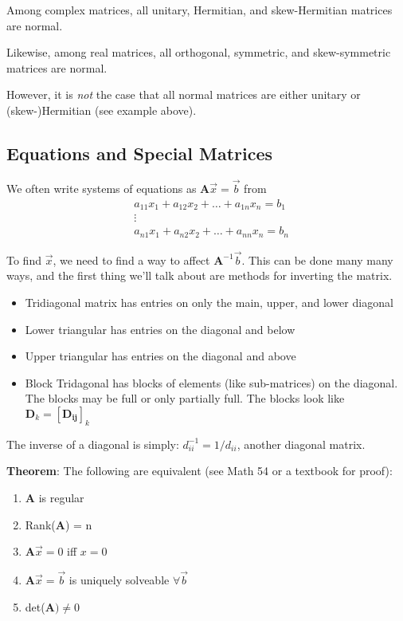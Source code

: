 \documentclass[12pt]{article}
\newcommand{\ve}[1]{\ensuremath{\mathbf{#1}}}
\begin{document}
Among complex matrices, all unitary, Hermitian, and skew-Hermitian matrices are normal. 

Likewise, among real matrices, all orthogonal, symmetric, and skew-symmetric matrices are normal. 

However, it is \textit{not} the case that all normal matrices are either unitary or (skew-)Hermitian (see example above).%

\subsection{Equations and Special Matrices}

We often write systems of equations as $\ve{A}\vec{x} = \vec{b}$ from
\begin{align}
&a_{11} x_1 + a_{12} x_2 + \dots + a_{1n} x_n = b_1 \nonumber \\
&\vdots \nonumber \\
&a_{n1} x_1 + a_{n2} x_2 + \dots + a_{nn} x_n = b_n \nonumber
\end{align}

To find $\vec{x}$, we need to find a way to affect $\ve{A}^{-1}\vec{b}$. This can be done many many ways, and the first thing we'll talk about are methods for inverting the matrix.

\begin{itemize}
\item Tridiagonal matrix has entries on only the main, upper, and lower diagonal
\item Lower triangular has entries on the diagonal and below
\item Upper triangular has entries on the diagonal and above 
\item Block Tridagonal has blocks of elements (like sub-matrices) on the diagonal. The blocks may be full or only partially full. The blocks look like $\ve{D}_k = [\ve{D_{ij}}]_k$
\end{itemize}

The inverse of a diagonal is simply: $d_{ii}^{-1} = 1/d_{ii}$, another diagonal matrix.

\textbf{Theorem}: The following are equivalent (see Math 54 or a textbook for proof):
%
\begin{enumerate}
\item $\ve{A}$ is regular
\item Rank($\ve{A}$) = n
\item $\ve{A}\vec{x} = 0$ iff $x=0$
\item $\ve{A}\vec{x} = \vec{b}$ is uniquely solveable $\forall \vec{b}$
\item det($\ve{A}) \neq 0$
\end{enumerate}
\end{document}
